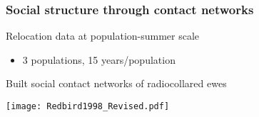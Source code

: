 \documentclass[fleqn,xcolor=table]{beamer}
\begin{document}
\begin{frame}[t]
\frametitle{\color{darkred} Social structure through contact networks}
	\begin{itemize}
		{\small
		\item \color{navy} Relocation data at population-summer scale 
			\begin{itemize}
				\item[] \color{navy} {\footnotesize 3 populations, 15
					years/population}
			\end{itemize}
		\item \color{navy} Built social contact networks of radiocollared ewes
		}
	\end{itemize}
	\vspace{.3in}
%
	\texttt{[image: Redbird1998\_Revised.pdf]}
	\hspace{.15in}
\end{frame}
\end{document}
